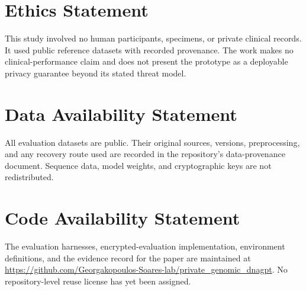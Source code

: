 
\section*{Ethics Statement}

This study involved no human participants, specimens, or private clinical records. It used public
reference datasets with recorded provenance. The work makes no clinical-performance claim and
does not present the prototype as a deployable privacy guarantee beyond its stated threat model.

\section*{Data Availability Statement}

All evaluation datasets are public. Their original sources, versions, preprocessing, and any
recovery route used are recorded in the repository's data-provenance document. Sequence data,
model weights, and cryptographic keys are not redistributed.

\section*{Code Availability Statement}

The evaluation harnesses, encrypted-evaluation implementation, environment definitions, and the
evidence record for the paper are maintained at
\url{https://github.com/Georgakopoulos-Soares-lab/private_genomic_dnagpt}. No repository-level
reuse license has yet been assigned.

